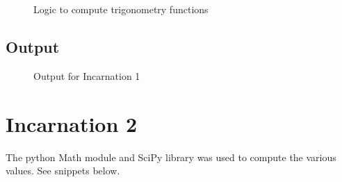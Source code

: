    \begin{figure}[h!]
      \centering
      \caption{Logic to compute trigonometry functions}
      \label{fig:trigonometric Functions}
    \end{figure}
    \pagebreak

    \subsection{Output}
    \begin{figure}[h!]
      \centering
      \caption{Output for Incarnation 1}
      \label{fig:Text-based output}
    \end{figure}
    \pagebreak

\section{Incarnation 2}
  \begin{flushleft}
    The python Math module and SciPy library was used to compute the various values. See snippets below.
  \end{flushleft}

